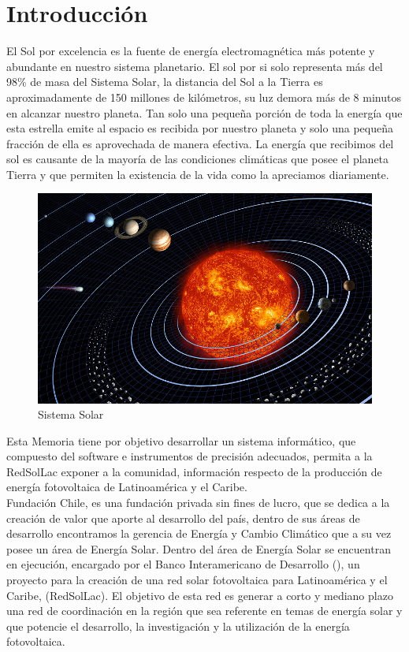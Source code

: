\chapter{Introducción}
\label{ch:introduccion}

El Sol por excelencia es la fuente de energía electromagnética más potente y abundante en nuestro sistema planetario. El sol por si solo representa más del 98\% de masa del Sistema Solar, la distancia del Sol a la Tierra es aproximadamente de 150 millones de kilómetros, su luz demora más de 8 minutos en alcanzar nuestro planeta. Tan solo una pequeña porción de toda la energía que esta estrella emite al espacio es recibida por nuestro planeta y solo una pequeña fracción de ella es aprovechada de manera efectiva. La energía que recibimos del sol es causante de la mayoría de las condiciones climáticas que posee el planeta Tierra y que permiten la existencia de la vida como la apreciamos diariamente.\\

\begin{figure}[h!]
        \centering
        \includegraphics[scale=0.35]{images/solarSis}
        \caption{Sistema Solar}
\end{figure}

Esta Memoria tiene por objetivo desarrollar un sistema informático, que compuesto del software e instrumentos de precisión adecuados, permita a la RedSolLac exponer a la comunidad, información respecto de la producción de energía fotovoltaica de Latinoamérica y el Caribe.\\ 
	
Fundación Chile, es una fundación privada sin fines de lucro, que se dedica a la creación de valor que aporte al desarrollo del país, dentro de sus áreas de desarrollo encontramos la gerencia de Energía y Cambio Climático que a su vez posee un área de Energía Solar. Dentro del área de Energía Solar se encuentran en ejecución, encargado por el Banco Interamericano de Desarrollo (), un proyecto para la creación de una red solar fotovoltaica para Latinoamérica y el Caribe, (RedSolLac\cite{redSolLac:1}). El objetivo de esta red es generar a corto y mediano plazo una red de coordinación en la región que sea referente en temas de energía solar y que potencie el desarrollo, la investigación y la utilización de la energía fotovoltaica.\\
 
